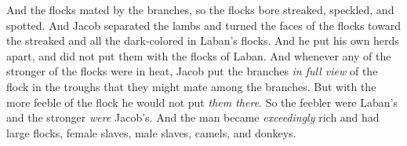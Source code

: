\begin{biblechapter}
\verse And the flocks mated by the branches, so the flocks bore streaked, speckled, and spotted.
\verse And Jacob separated the lambs and turned the faces of the flocks toward the streaked and all the dark-colored in Laban’s flocks. And he put his own herds apart, and did not put them with the flocks of Laban.
\verse And whenever any of the stronger of the flocks were in heat, Jacob put the branches \textit{in full view} of the flock in the troughs that they might mate among the branches.
\verse But with the more feeble of the flock he would not put \textit{them there}. So the feebler were Laban’s and the stronger \textit{were} Jacob’s.
\verse And the man became \textit{exceedingly} rich and had large flocks, female slaves, male slaves, camels, and donkeys.
\end{biblechapter}

